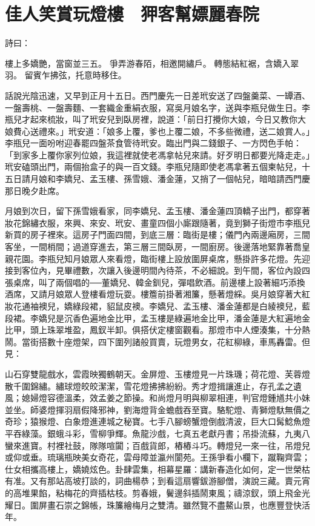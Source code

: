 %

\chapter{佳人笑賞玩燈樓　狎客幫嫖麗春院}

詩曰：

樓上多嬌艷，當窗並三五。
爭弄游春陌，相邀開繡戶。
轉態結紅裾，含嬌入翠羽。
留賓乍拂弦，托意時移住。

話說光陰迅速，又早到正月十五日。西門慶先一日差玳安送了四盤羹菜、一罈酒、一盤壽桃、一盤壽麵、一套織金重絹衣服，寫吳月娘名字，送與李瓶兒做生日。李瓶兒才起來梳妝，叫了玳安兒到臥房裡，說道：「前日打攪你大娘，今日又教你大娘費心送禮來。」玳安道：「娘多上覆，爹也上覆二娘，不多些微禮，送二娘賞人。」李瓶兒一面吩咐迎春罷四盤茶食管待玳安。臨出門與二錢銀子、一方閃色手帕：「到家多上覆你家列位娘，我這裡就使老馮拿帖兒來請。好歹明日都要光降走走。」玳安磕頭出門，兩個抬盒子的與一百文錢。李瓶兒隨即使老馮拿著五個柬帖兒，十五日請月娘和李嬌兒、孟玉樓、孫雪娥、潘金蓮，又捎了一個帖兒，暗暗請西門慶那日晚夕赴席。

月娘到次日，留下孫雪娥看家，同李嬌兒、孟玉樓、潘金蓮四頂轎子出門，都穿著妝花錦繡衣服，來興、來安、玳安、畫童四個小廝跟隨著，竟到獅子街燈市李瓶兒新買的房子裡來。這房子門面四間，到底三層：臨街是樓；儀門內兩邊廂房，三間客坐，一間梢間；過道穿進去，第三層三間臥房，一間廚房。後邊落地緊靠著喬皇親花園。李瓶兒知月娘眾人來看燈，臨街樓上設放圍屏桌席，懸掛許多花燈。先迎接到客位內，見畢禮數，次讓入後邊明間內待茶，不必細說。到午間，客位內設四張桌席，叫了兩個唱的──董嬌兒、韓金釧兒，彈唱飲酒。前邊樓上設著細巧添換酒席，又請月娘眾人登樓看燈玩耍。樓簷前掛著湘簾，懸著燈綵。吳月娘穿著大紅妝花通袖襖兒，嬌綠段裙，貂鼠皮襖。李嬌兒、孟玉樓、潘金蓮都是白綾襖兒，藍段裙。李嬌兒是沉香色遍地金比甲，孟玉樓是綠遍地金比甲，潘金蓮是大紅遍地金比甲，頭上珠翠堆盈，鳳釵半卸。俱搭伏定樓窗觀看。那燈市中人煙湊集，十分熱鬧。當街搭數十座燈架，四下圍列諸般買賣，玩燈男女，花紅柳綠，車馬轟雷。但見：

山石穿雙龍戲水，雲霞映獨鶴朝天。金屏燈、玉樓燈見一片珠璣；荷花燈、芙蓉燈散千圍錦繡。繡球燈皎皎潔潔，雪花燈拂拂紛紛。秀才燈揖讓進止，存孔孟之遺風；媳婦燈容德溫柔，效孟姜之節操。和尚燈月明與柳翠相連，判官燈鍾馗共小妹並坐。師婆燈揮羽扇假降邪神，劉海燈背金蟾戲吞至寶。駱駝燈、青獅燈馱無價之奇珍；猿猴燈、白象燈進連城之秘寶。七手八腳螃蟹燈倒戲清波，巨大口髯鯰魚燈平吞綠藻。銀蛾斗彩，雪柳爭輝。魚龍沙戲，七真五老獻丹書；吊掛流蘇，九夷八蠻來進寶。村裡社鼓，隊隊喧闐；百戲貨郎，樁樁斗巧。轉燈兒一來一往，吊燈兒或仰或垂。琉璃瓶映美女奇花，雲母障並瀛州閬苑。王孫爭看小欄下，蹴鞠齊雲；仕女相攜高樓上，嬌嬈炫色。卦肆雲集，相幕星羅：講新春造化如何，定一世榮枯有准。又有那站高坡打談的，詞曲楊恭；到看這扇響鈸游腳僧，演說三藏。賣元宵的高堆果餡，粘梅花的齊插枯枝。剪春娥，鬢邊斜插鬧東風；禱涼釵，頭上飛金光耀日。圍屏畫石崇之錦帳，珠簾繪梅月之雙清。雖然覽不盡鰲山景，也應豐登快活年。


